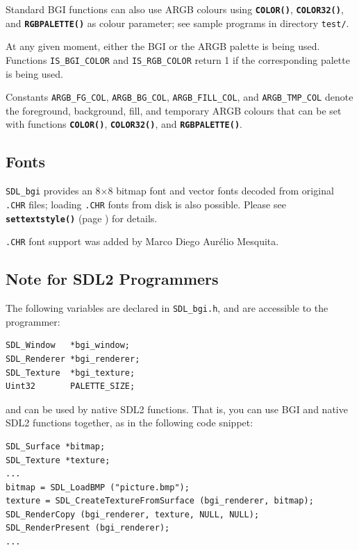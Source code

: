 \documentclass[a4paper,12pt]{article}
\newcommand{\func}[1]{\textbf{\texttt{#1}}}  %
\newcommand{\F}[1]{\texttt{#1}}     %
\newcommand{\T}[1]{\texttt{#1}}     %
\newcommand{\file}[1]{\texttt{#1}}  %
\newcommand{\SDLbgi}{\texttt{SDL\_bgi}}
\begin{document}
Standard BGI functions can also use ARGB colours using \func{COLOR()},
\func{COLOR32()}, and \func{RGBPALETTE()} as colour parameter; see
sample programs in directory \file{test/}.

At any given moment, either the BGI or the ARGB palette is being used.
Functions \T{IS\_BGI\_COLOR} and \T{IS\_RGB\_COLOR} return 1 if the
corresponding palette is being used.

Constants \T{ARGB\_FG\_COL}, \T{ARGB\_BG\_COL}, \T{ARGB\_FILL\_COL},
and \T{ARGB\_TMP\_COL} denote the foreground, background, fill, and
temporary ARGB colours that can be set with functions \func{COLOR()},
\func{COLOR32()}, and \func{RGBPALETTE()}.


\subsection{Fonts}

\SDLbgi{} provides an 8$\times$8 bitmap font and vector fonts decoded
from original \T{.CHR} files; loading \T{.CHR} fonts from disk is also
possible. Please see \func{settextstyle()} (page
\pageref{sec:settextstyle}) for details.

\T{.CHR} font support was added by Marco Diego Aur\'elio Mesquita.



\subsection{Note for SDL2 Programmers}

The following variables are declared in \F{SDL\_bgi.h}, and are
accessible to the programmer:

\begin{small}
\begin{spacing}{0.85}
\begin{verbatim}
SDL_Window   *bgi_window;
SDL_Renderer *bgi_renderer;
SDL_Texture  *bgi_texture;
Uint32       PALETTE_SIZE;
\end{verbatim}
\end{spacing}
\end{small}

and can be used by native SDL2 functions. That is, you can use BGI and
native SDL2 functions together, as in the following code snippet:

\begin{small}
\begin{spacing}{0.85}
\begin{verbatim}
SDL_Surface *bitmap;
SDL_Texture *texture;
...
bitmap = SDL_LoadBMP ("picture.bmp");
texture = SDL_CreateTextureFromSurface (bgi_renderer, bitmap);
SDL_RenderCopy (bgi_renderer, texture, NULL, NULL);
SDL_RenderPresent (bgi_renderer);
...
\end{verbatim}
\end{spacing}
\end{small}
\end{document}
